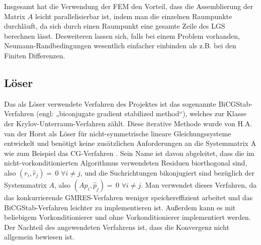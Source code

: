 Insgesamt hat die Verwendung der FEM den Vorteil, dass die Assemblierung der Matrix $A$ leicht parallelisierbar ist, indem man die einzelnen Raumpunkte durchläuft, da sich durch einen Raumpunkt eine gesamte Zeile des LGS berechnen lässt. Desweiteren lassen sich, falls bei einem Problem vorhanden, Neumann-Randbedingungen wesentlich einfacher einbinden als z.B. bei den Finiten Differenzen. 


\subsection{Löser}
Das als Löser verwendete Verfahren des Projektes ist das sogenannte BiCGStab-\newline Verfahren (engl: „biconjugate gradient stabilized method“), welches zur Klasse der Krylov-Unterraum-Verfahren zählt. Diese iterative Methode wurde von H.A. van der Horst als Löser für nicht-symmetrische lineare Gleichungssysteme entwickelt und benötigt keine zusätzlichen Anforderungen an die Systemmatrix A wie zum Beispiel das CG-Verfahren \cite{BiCGSTAB}. Sein Name ist davon abgeleitet, dass die im nicht-vorkonditionierten Algorithmus verwendeten Residuen biorthogonal sind, also $(r_i,\hat{r}_j)=\,0$ $\forall i\neq j$, und die Suchrichtungen bikonjugiert sind bezüglich der Systemmatrix $A$, also $(Ap_i,\hat{p}_j)=\,0$ $ \forall i \neq j$.  Man verwendet dieses Verfahren, da das konkurrierende GMRES-Verfahren weniger speichereffizient arbeitet und das BiCGStab-Verfahren leichter zu implementieren ist.  Au\ss{}erdem kann es mit beliebigem Vorkonditionierer und ohne Vorkonditionierer implementiert werden. Der Nachteil des angewendeten Verfahrens ist, dass die Konvergenz nicht allgemein bewiesen ist.  \\



